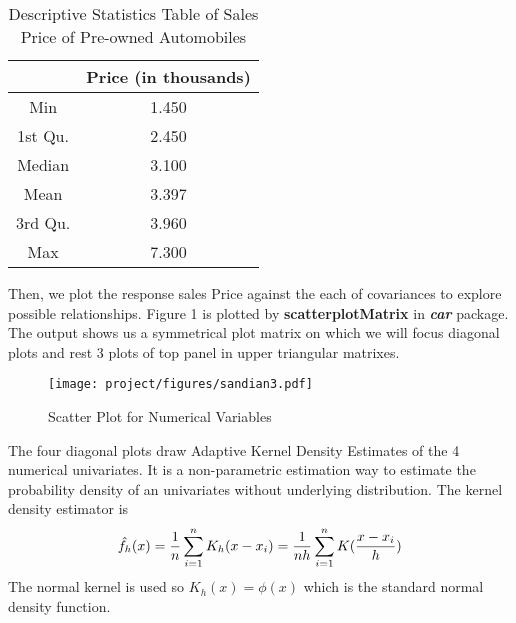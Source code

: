 \documentclass[a4paper]{article}
\begin{document}
\begin{table}[!htb]
    \centering
    \begin{tabular}{cc}
    \toprule
         &  Price (in thousands) \\
    \midrule
        Min  &  1.450 \\ 
         1st Qu.  &  2.450 \\ 
          Median  &  3.100 \\ 
           Mean  &  3.397 \\ 
            3rd Qu.  &  3.960 \\ 
             Max  &  7.300 \\ 
    \bottomrule
    \end{tabular}
    \caption{Descriptive Statistics Table of Sales Price of Pre-owned Automobiles}
    \label{tab:my_label}
\end{table}

\noindent
Then, we plot the response sales Price against the each of covariances to explore possible relationships. Figure 1 is plotted by \textbf{scatterplotMatrix} in \textbf{\textit{car}} package. The output shows us a symmetrical plot matrix on which we will focus diagonal plots and rest 3 plots of top panel in upper triangular matrixes. \\

\begin{figure}[!htb]
    \centering
    \texttt{[image: project/figures/sandian3.pdf]}
    \caption{Scatter Plot for Numerical Variables}
    \label{1}
\end{figure}

\noindent
The four diagonal plots draw Adaptive Kernel Density Estimates of the 4 numerical univariates. It is a non-parametric estimation way to estimate the probability density of an univariates without underlying distribution. The kernel density estimator is 
\begin{equation*}
    \hat{f_h}(x) = \frac{1}{n} \sum_{i=1}^{n}K_h(x-x_i)=\frac{1}{nh} \sum_{i=1}^{n} K \large{(}\frac{x-x_i}{h} \large{)}
\end{equation*}
The normal kernel is used so $K_h(x)=\phi(x)$ which is the standard normal density function.\\
\end{document}
